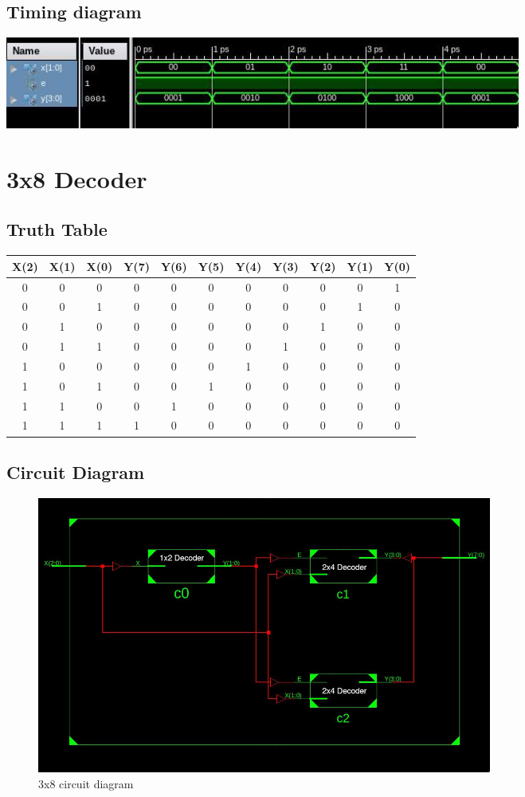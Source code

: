 \documentclass[titlepage]{article}
\begin{document}
    \subsection{Timing diagram}
    \includegraphics[width=17cm]{./figures/td_2x4.jpeg}


    \section{3x8 Decoder}
    \subsection{Truth Table}
    \begin{tabular}{| c | c | c | c | c | c | c | c | c  |c | c |}
        \hline
        X(2) & X(1) & X(0) & Y(7) & Y(6) & Y(5) & Y(4) & Y(3) & Y(2) & Y(1) & Y(0) \\
        \hline
        0 & 0 & 0 & 0 & 0 & 0 & 0 & 0 & 0 & 0 & 1 \\
        0 & 0 & 1 & 0 & 0 & 0 & 0 & 0 & 0 & 1 & 0 \\
        0 & 1 & 0 & 0 & 0 & 0 & 0 & 0 & 1 & 0 & 0 \\
        0 & 1 & 1 & 0 & 0 & 0 & 0 & 1 & 0 & 0 & 0 \\
        1 & 0 & 0 & 0 & 0 & 0 & 1 & 0 & 0 & 0 & 0 \\
        1 & 0 & 1 & 0 & 0 & 1 & 0 & 0 & 0 & 0 & 0 \\
        1 & 1 & 0 & 0 & 1 & 0 & 0 & 0 & 0 & 0 & 0 \\
        1 & 1 & 1 & 1 & 0 & 0 & 0 & 0 & 0 & 0 & 0 \\
        \hline
    \end{tabular}
    \subsection{Circuit Diagram}
    \begin{figure}[!ht]
        \centering
        \includegraphics[width=15cm]{./figures/3x8.jpeg}
        \caption{3x8 circuit diagram}
    \end{figure}
\end{document}
